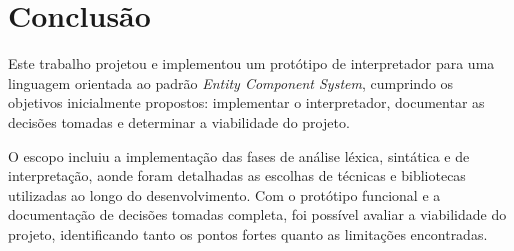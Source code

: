 






\chapter{Conclusão} \label{ch:conclusao}

Este trabalho projetou e implementou um protótipo de interpretador para uma linguagem orientada ao padrão \textit{Entity Component System}, cumprindo os objetivos inicialmente propostos: implementar o interpretador, documentar as decisões tomadas e determinar a viabilidade do projeto.

O escopo incluiu a implementação das fases de análise léxica, sintática e de interpretação, aonde foram detalhadas as escolhas de técnicas e bibliotecas utilizadas ao longo do desenvolvimento. Com o protótipo funcional e a documentação de decisões tomadas completa, foi possível avaliar a viabilidade do projeto, identificando tanto os pontos fortes quanto as limitações encontradas.

